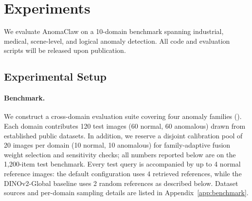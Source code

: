 \section{Experiments}
\label{sec:experiments}

We evaluate AnomaClaw on a 10-domain benchmark spanning industrial, medical, scene-level, and logical anomaly detection.
All code and evaluation scripts will be released upon publication.

\subsection{Experimental Setup}
\label{sec:setup}

\paragraph{Benchmark.}
We construct a cross-domain evaluation suite covering four anomaly families ().
Each domain contributes 120 test images (60 normal, 60 anomalous) drawn from established public datasets.
In addition, we reserve a disjoint calibration pool of 20 images per domain (10 normal, 10 anomalous) for family-adaptive fusion weight selection and sensitivity checks; all numbers reported below are on the 1{,}200-item test benchmark.
Every test query is accompanied by up to 4 normal reference images: the default configuration uses 4 retrieved references, while the DINOv2-Global baseline uses 2 random references as described below. Dataset sources and per-domain sampling details are listed in Appendix~\ref{app:benchmark}.

